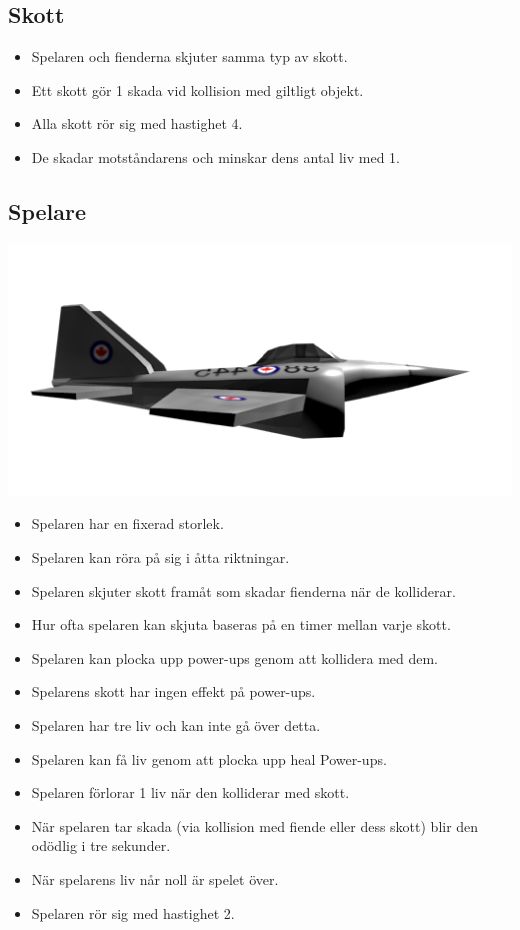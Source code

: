 \documentclass{TDP005mall}
\begin{document}
\subsection{Skott}
\begin{itemize}
\item Spelaren och fienderna skjuter samma typ av skott.
\item Ett skott gör 1 skada vid kollision med giltligt objekt.
\item Alla skott rör sig med hastighet 4.
\item De skadar motståndarens och minskar dens antal liv med 1.
\end{itemize}

\subsection{Spelare}
\includegraphics[scale=0.2]{Images/Player.png}
\begin{itemize}
\item Spelaren har en fixerad storlek.
\item Spelaren kan röra på sig i åtta riktningar.
\item Spelaren skjuter skott framåt som skadar fienderna när de kolliderar.
\item Hur ofta spelaren kan skjuta baseras på en timer mellan varje skott. 
\item Spelaren kan plocka upp power-ups genom att kollidera med dem.
\item Spelarens skott har ingen effekt på power-ups.
\item Spelaren har tre liv och kan inte gå över detta.
\item Spelaren kan få liv genom att plocka upp heal Power-ups.
\item Spelaren förlorar 1 liv när den kolliderar med skott.
\item När spelaren tar skada (via kollision med fiende eller dess skott) blir den odödlig i tre sekunder.
\item När spelarens liv når noll är spelet över.
\item Spelaren rör sig med hastighet 2.


\end{itemize}
\end{document}

